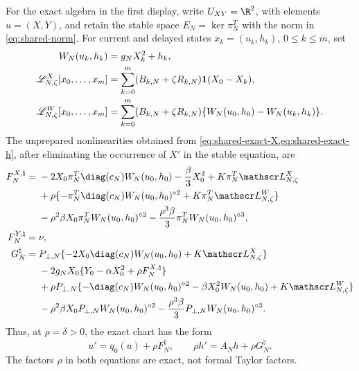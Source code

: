 For the exact algebra in the first display, write
\(U_{XY}=\R^2\), with elements \(u=(X,Y)\), and retain the stable space
\(E_N=\ker\pi_N^T\) with the norm in \cref{eq:shared-norm}.  For current and
delayed states \(x_k=(u_k,h_k)\), \(0\leq k\leq m\), set
\begin{align}
 W_N(u_k,h_k)&=g_NX_k^2+h_k,\notag\\
 \mathscr L^X_{N,\zeta}[x_0,\ldots,x_m]
 &=\sum_{k=0}^m(B_{k,N}+\zeta R_{k,N})
       \mathbf1(X_0-X_k),\notag\\
 \mathscr L^W_{N,\zeta}[x_0,\ldots,x_m]
 &=\sum_{k=0}^m(B_{k,N}+\zeta R_{k,N})
       \{W_N(u_0,h_0)-W_N(u_k,h_k)\}.                 \label{eq:invdet-delay-polynomials}
\end{align}
The unprepared nonlinearities obtained from
\cref{eq:shared-exact-X,eq:shared-exact-h}, after eliminating the occurrence
of \(X'\) in the stable equation, are
\begin{align}
 F^{X,\natural}_N={}&-2X_0\pi_N^T\diag(c_N)W_N(u_0,h_0)
 -\frac\beta3X_0^3+K\pi_N^T\mathscr L^X_{N,\zeta}\notag\\
 &+\rho\{-\pi_N^T\diag(c_N)W_N(u_0,h_0)^{\circ2}
             +K\pi_N^T\mathscr L^W_{N,\zeta}\}\notag\\
 &-\rho^2\beta X_0\pi_N^TW_N(u_0,h_0)^{\circ2}
 -\frac{\rho^3\beta}{3}\pi_N^TW_N(u_0,h_0)^{\circ3},\notag\\
 F^{Y,\natural}_N={}&\nu,                              \label{eq:invdet-raw-F}\\
 G_N^\natural={}&P_{\perp,N}\{-2X_0\diag(c_N)W_N(u_0,h_0)
                    +K\mathscr L^X_{N,\zeta}\}\notag\\
 &-2g_NX_0\{Y_0-\alpha X_0^2+\rho F_N^{X,\natural}\}\notag\\
 &+\rho P_{\perp,N}\{-\diag(c_N)W_N(u_0,h_0)^{\circ2}
                  -\beta X_0^2W_N(u_0,h_0)
                  +K\mathscr L^W_{N,\zeta}\}\notag\\
 &-\rho^2\beta X_0P_{\perp,N}W_N(u_0,h_0)^{\circ2}
 -\frac{\rho^3\beta}{3}P_{\perp,N}W_N(u_0,h_0)^{\circ3}.       \label{eq:invdet-raw-G}
\end{align}
Thus, at \(\rho=\delta>0\), the exact chart has the form
\begin{equation}
 u'=q_0(u)+\rho F_N^\natural,
 \qquad
 \rho h'=A_Nh+\rho G_N^\natural.                     \label{eq:invdet-raw-normal-form}
\end{equation}
The factors \(\rho\) in both equations are exact, not formal Taylor
factors.

